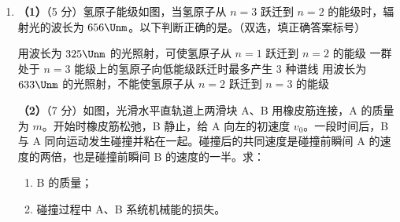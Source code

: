 \documentclass[\gkver]{gaokaozhenti}
\begin{document}
\begin{enumerate}
{联立③④式，代入数据得 $i=45^{\circ}$ ⑤


(ii) 在 $\triangle OPB$ 中，根据正弦定理得

$\frac{\overline{OP}}{\sin75^{\circ}}=\frac{L}{\sin45^{\circ}}$ ⑥

设所用时间为 $t$，光线在介质中的速度为 $v$，得

$\overline{OP}=vt$ ⑦

$v=\frac{c}{n}$ ⑧

联立⑥⑦⑧式，代入数据得

$t=\frac{(\sqrt{6}+\sqrt{2})L}{2c}$ ⑨
}

\item
\textbf{（1）}（5 分）氢原子能级如图，当氢原子从 $n=3$ 跃迁到 $n=2$ 的能级时，辐射光的波长为 $656\Unm$。以下判断正确的是。（双选，填正确答案标号）


{用波长为 $325\Unm$ 的光照射，可使氢原子从 $n=1$ 跃迁到 $n=2$ 的能级}
{一群处于 $n=3$ 能级上的氢原子向低能级跃迁时最多产生 3 种谱线}
{用波长为 $633\Unm$ 的光照射，不能使氢原子从 $n=2$ 跃迁到 $n=3$ 的能级}

\textbf{（2）}（7 分）如图，光滑水平直轨道上两滑块 A、B 用橡皮筋连接，A 的质量为 $m$。开始时橡皮筋松弛，B 静止，给 A 向左的初速度 $v_{0}$。一段时间后，B 与 A 同向运动发生碰撞并粘在一起。碰撞后的共同速度是碰撞前瞬间 A 的速度的两倍，也是碰撞前瞬间 B 的速度的一半。求：
\begin{enumerate}
	\item
	B 的质量；
	\item
	碰撞过程中 A、B 系统机械能的损失。
\end{enumerate}


\end{enumerate}
\end{document}

